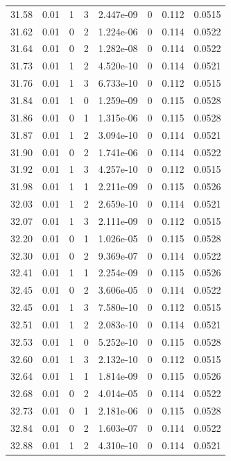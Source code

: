 \documentclass[preview]{standalone}
\begin{document}
{{{{{{{{{{{{{\begin{tabular}{L{1.2cm}C{1.2cm} C{0.3cm}C{0.5cm} C{1.4cm}C{1.4cm} C{1.4cm}C{1.4cm}}
  31.58  &  0.01  & 1     &  3 &  2.447e-09  & 0  & 0.112 &  0.0515   \\ 
  31.62  &  0.01  & 0     &  2 &  1.224e-06  & 0  & 0.114 &  0.0522   \\ 
  31.64  &  0.01  & 0     &  2 &  1.282e-08  & 0  & 0.114 &  0.0522   \\ 
  31.73  &  0.01  & 1     &  2 &  4.520e-10  & 0  & 0.114 &  0.0521   \\ 
  31.76  &  0.01  & 1     &  3 &  6.733e-10  & 0  & 0.112 &  0.0515   \\ 
  31.84  &  0.01  & 1     &  0 &  1.259e-09  & 0  & 0.115 &  0.0528   \\ 
  31.86  &  0.01  & 0     &  1 &  1.315e-06  & 0  & 0.115 &  0.0528   \\ 
  31.87  &  0.01  & 1     &  2 &  3.094e-10  & 0  & 0.114 &  0.0521   \\ 
  31.90  &  0.01  & 0     &  2 &  1.741e-06  & 0  & 0.114 &  0.0522   \\ 
  31.92  &  0.01  & 1     &  3 &  4.257e-10  & 0  & 0.112 &  0.0515   \\ 
  31.98  &  0.01  & 1     &  1 &  2.211e-09  & 0  & 0.115 &  0.0526   \\ 
  32.03  &  0.01  & 1     &  2 &  2.659e-10  & 0  & 0.114 &  0.0521   \\ 
  32.07  &  0.01  & 1     &  3 &  2.111e-09  & 0  & 0.112 &  0.0515   \\ 
  32.20  &  0.01  & 0     &  1 &  1.026e-05  & 0  & 0.115 &  0.0528   \\ 
  32.30  &  0.01  & 0     &  2 &  9.369e-07  & 0  & 0.114 &  0.0522   \\ 
  32.41  &  0.01  & 1     &  1 &  2.254e-09  & 0  & 0.115 &  0.0526   \\ 
  32.45  &  0.01  & 0     &  2 &  3.606e-05  & 0  & 0.114 &  0.0522   \\ 
  32.45  &  0.01  & 1     &  3 &  7.580e-10  & 0  & 0.112 &  0.0515   \\ 
  32.51  &  0.01  & 1     &  2 &  2.083e-10  & 0  & 0.114 &  0.0521   \\ 
  32.53  &  0.01  & 1     &  0 &  5.252e-10  & 0  & 0.115 &  0.0528   \\ 
  32.60  &  0.01  & 1     &  3 &  2.132e-10  & 0  & 0.112 &  0.0515   \\ 
  32.64  &  0.01  & 1     &  1 &  1.814e-09  & 0  & 0.115 &  0.0526   \\ 
  32.68  &  0.01  & 0     &  2 &  4.014e-05  & 0  & 0.114 &  0.0522   \\ 
  32.73  &  0.01  & 0     &  1 &  2.181e-06  & 0  & 0.115 &  0.0528   \\ 
  32.84  &  0.01  & 0     &  2 &  1.603e-07  & 0  & 0.114 &  0.0522   \\ 
  32.88  &  0.01  & 1     &  2 &  4.310e-10  & 0  & 0.114 &  0.0521   \\ 
\hline 
\end{tabular} 

}}}}}}}}}}}}}
\end{document}
